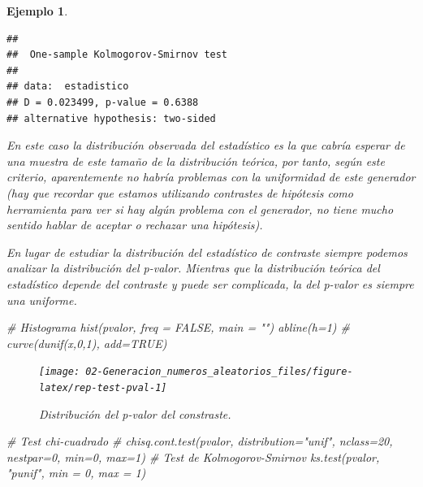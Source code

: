 \documentclass[
]{book}
\newenvironment{Shaded}{\begin{snugshade}}{\end{snugshade}}
\newcommand{\AttributeTok}[1]{\textcolor[rgb]{0.77,0.63,0.00}{#1}}
\newcommand{\CommentTok}[1]{\textcolor[rgb]{0.56,0.35,0.01}{\textit{#1}}}
\newcommand{\ConstantTok}[1]{\textcolor[rgb]{0.00,0.00,0.00}{#1}}
\newcommand{\DecValTok}[1]{\textcolor[rgb]{0.00,0.00,0.81}{#1}}
\newcommand{\FunctionTok}[1]{\textcolor[rgb]{0.00,0.00,0.00}{#1}}
\newcommand{\NormalTok}[1]{#1}
\newcommand{\StringTok}[1]{\textcolor[rgb]{0.31,0.60,0.02}{#1}}
\theoremstyle{break}
\newtheorem{example}{Ejemplo}[chapter]
\theoremstyle{nonumberplain}
\begin{document}
\begin{example}
\begin{verbatim}
## 
##  One-sample Kolmogorov-Smirnov test
## 
## data:  estadistico
## D = 0.023499, p-value = 0.6388
## alternative hypothesis: two-sided
\end{verbatim}

En este caso la distribución observada del estadístico es la que cabría esperar de una muestra de este tamaño de la distribución teórica, por tanto, según este criterio, aparentemente no habría problemas con la uniformidad de este generador (hay que recordar que estamos utilizando contrastes de hipótesis como herramienta para ver si hay algún problema con el generador, no tiene mucho sentido hablar de aceptar o rechazar una hipótesis).

En lugar de estudiar la distribución del estadístico de contraste siempre podemos analizar la distribución del p-valor.
Mientras que la distribución teórica del estadístico depende del contraste y puede ser complicada, la del p-valor es siempre una uniforme.

\begin{Shaded}
\begin{Highlighting}[]
\CommentTok{\# Histograma}
\FunctionTok{hist}\NormalTok{(pvalor, }\AttributeTok{freq =} \ConstantTok{FALSE}\NormalTok{, }\AttributeTok{main =} \StringTok{""}\NormalTok{)}
\FunctionTok{abline}\NormalTok{(}\AttributeTok{h=}\DecValTok{1}\NormalTok{) }\CommentTok{\# curve(dunif(x,0,1), add=TRUE)}
\end{Highlighting}
\end{Shaded}

\begin{figure}[!htb]

{\centering \texttt{[image: 02-Generacion\_numeros\_aleatorios\_files/figure-latex/rep-test-pval-1]} 

}

\caption{Distribución del p-valor del constraste.}\label{fig:rep-test-pval}
\end{figure}

\begin{Shaded}
\begin{Highlighting}[]
\CommentTok{\# Test chi{-}cuadrado}
\CommentTok{\# chisq.cont.test(pvalor, distribution="unif", nclass=20, nestpar=0, min=0, max=1)}
\CommentTok{\# Test de Kolmogorov{-}Smirnov}
\FunctionTok{ks.test}\NormalTok{(pvalor, }\StringTok{"punif"}\NormalTok{,  }\AttributeTok{min =} \DecValTok{0}\NormalTok{, }\AttributeTok{max =} \DecValTok{1}\NormalTok{)}
\end{Highlighting}
\end{Shaded}


\end{example}
\end{document}
